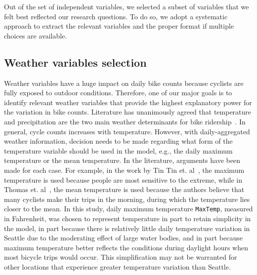 \documentclass [11pt, proquest] {uwthesis}[2015/03/03]
\begin{document}
Out of the set of independent variables, we selected a subset of variables that we felt best reflected our research questions. To do so, we adopt a systematic approach to extract the relevant variables and the proper format if multiple choices are available.

\subsection{Weather variables selection}
Weather variables have a huge impact on daily bike counts because cyclists are fully exposed to outdoor conditions. Therefore, one of our major goals is to identify relevant weather variables that provide the highest explanatory power for the variation in bike counts. Literature has unanimously agreed that temperature and precipitation are the two main weather determinants for bike ridership~\cite{Nosal:2014aa,Tin:2012aa}. In general, cycle counts increases with temperature. However, with daily-aggregated weather information, decision needs to be made regarding what form of the temperature variable should be used in the model, e.g., the daily maximum temperature or the mean temperature. In the literature, arguments have been made for each case. For example, in the work by Tin Tin et. al~\cite{Tin:2012aa}, the maximum temperature is used because people are most sensitive to the extreme, while in Thomas et. al~\cite{Thomas09}, the mean temperature is used because the authors believe that many cyclists make their trips in the morning, during which the temperature lies closer to the mean. In this study, daily maximum temperature \texttt{MaxTemp}, measured in Fahrenheit, was chosen to represent temperature in part to retain simplicity in the model, in part because there is relatively little daily temperature variation in Seattle due to the moderating effect of large water bodies, and in part because maximum temperature better reflects the conditions during daylight hours when most bicycle trips would occur. This simplification may not be warranted for other locations that experience greater temperature variation than Seattle. 
\end{document}
